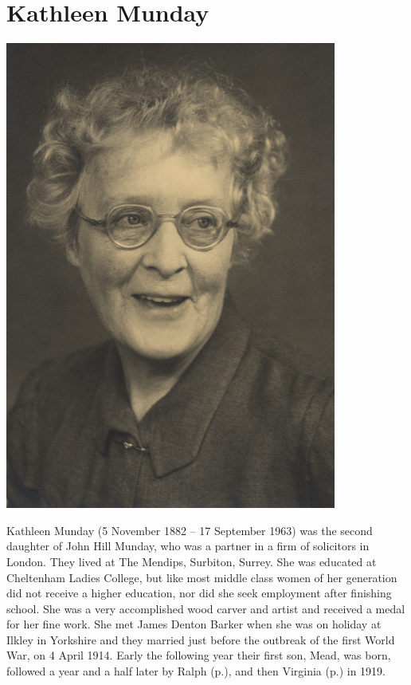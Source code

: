 \section{Kathleen Munday}\label{Kathleen_Munday}

\begin{center}
\includegraphics[width=0.8\linewidth]{photos/Kathleen_Munday}
\end{center}

Kathleen Munday (5 November 1882 -- 17 September 1963) was the second daughter of John Hill Munday, who was a partner in a firm of solicitors in London. They lived at The Mendips, Surbiton, Surrey. She was educated at Cheltenham Ladies College, but like most middle class women of her generation did not receive a higher education, nor did she seek employment after finishing school. She was a very accomplished wood carver and artist and received a medal for her fine work. She met James Denton Barker when she was on holiday at Ilkley in Yorkshire and they married just before the outbreak of the first World War, on 4 April 1914. Early the following year their first son, Mead, was born, followed a year and a half later by Ralph (p.\pageref{Ralph_Munday_Denton-Barker}), and then Virginia (p.\pageref{Virginia_Kathleen_Denton_Barker}) in 1919.
